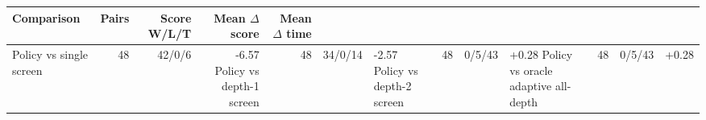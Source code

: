 \begin{tabular}{lrrrr}
\toprule
Comparison & Pairs & Score W/L/T & Mean $\Delta$ score & Mean $\Delta$ time \\
\midrule
Policy vs single screen & 48 & 42/0/6 & -6.57%
Policy vs depth-1 screen & 48 & 34/0/14 & -2.57%
Policy vs depth-2 screen & 48 & 0/5/43 & +0.28%
Policy vs oracle adaptive all-depth & 48 & 0/5/43 & +0.28%
\bottomrule
\end{tabular}
